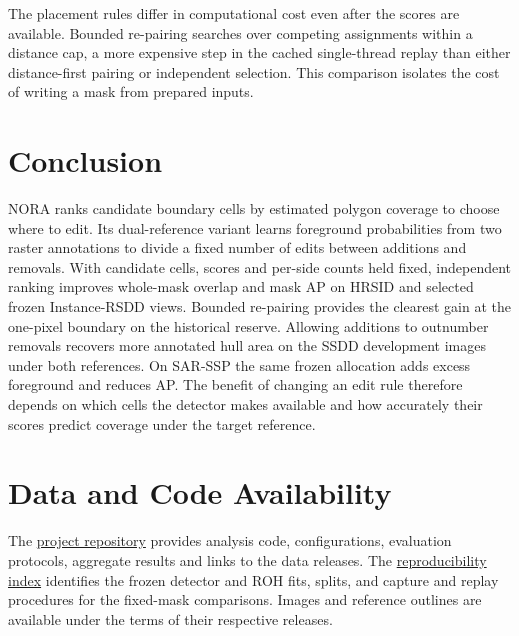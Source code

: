 \documentclass[journal]{IEEEtran}
\begin{document}
The placement rules differ in computational cost even after the scores are available. Bounded re-pairing searches over competing assignments within a distance cap, a more expensive step in the cached single-thread replay than either distance-first pairing or independent selection. This comparison isolates the cost of writing a mask from prepared inputs.

\section{Conclusion}
NORA ranks candidate boundary cells by estimated polygon coverage to choose where to edit. Its dual-reference variant learns foreground probabilities from two raster annotations to divide a fixed number of edits between additions and removals. With candidate cells, scores and per-side counts held fixed, independent ranking improves whole-mask overlap and mask AP on HRSID and selected frozen Instance-RSDD views. Bounded re-pairing provides the clearest gain at the one-pixel boundary on the historical reserve. Allowing additions to outnumber removals recovers more annotated hull area on the SSDD development images under both references. On SAR-SSP the same frozen allocation adds excess foreground and reduces AP. The benefit of changing an edit rule therefore depends on which cells the detector makes available and how accurately their scores predict coverage under the target reference.
\par\label{main:body:end}

\section*{Data and Code Availability}
The \href{https://github.com/bingzhi495-creator/SAR-SEAL-research}{project repository} provides analysis code, configurations, evaluation protocols, aggregate results and links to the data releases. The \href{https://github.com/bingzhi495-creator/SAR-SEAL-research/blob/main/research_round_20260925_global/paper_boundary_refinement_20261120/design/NORA_REPRODUCIBILITY.md}{reproducibility index} identifies the frozen detector and ROH fits, splits, and capture and replay procedures for the fixed-mask comparisons. Images and reference outlines are available under the terms of their respective releases.
\end{document}
